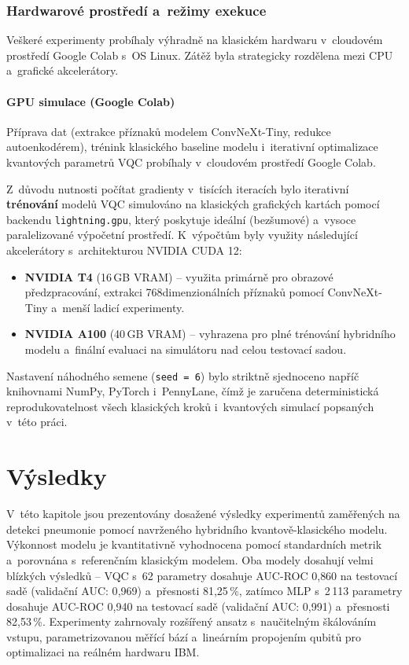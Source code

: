 \documentclass[12pt, a4paper]{report}
\begin{document}
\subsection{Hardwarové prostředí a~režimy exekuce}

Veškeré experimenty probíhaly výhradně na klasickém hardwaru v~cloudovém prostředí Google Colab s~OS Linux. Zátěž byla strategicky rozdělena mezi CPU a~grafické akcelerátory.

\subsubsection*{GPU simulace (Google Colab)}
Příprava dat (extrakce příznaků modelem ConvNeXt-Tiny, redukce autoenkodérem), trénink klasického baseline modelu i~iterativní optimalizace kvantových parametrů VQC probíhaly v~cloudovém prostředí Google Colab.

Z~důvodu nutnosti počítat gradienty v~tisících iteracích bylo iterativní \textbf{trénování} modelů VQC simulováno na klasických grafických kartách pomocí backendu \texttt{lightning.gpu}, který poskytuje ideální (bezšumové) a~vysoce paralelizované výpočetní prostředí. K~výpočtům byly využity následující akcelerátory s~architekturou NVIDIA CUDA 12:
\begin{itemize}
    \item \textbf{NVIDIA T4} (16\,GB VRAM) -- využita primárně pro obrazové předzpracování, extrakci 768dimenzionálních příznaků pomocí ConvNeXt-Tiny a~menší ladicí experimenty.
    \item \textbf{NVIDIA A100} (40\,GB VRAM) -- vyhrazena pro plné trénování hybridního modelu a~finální evaluaci na simulátoru nad celou testovací sadou.
\end{itemize}

Nastavení náhodného semene (\texttt{seed = 6}) bylo striktně sjednoceno napříč knihovnami NumPy, PyTorch i~PennyLane, čímž je zaručena deterministická reprodukovatelnost všech klasických kroků i~kvantových simulací popsaných v~této práci.

\chapter{Výsledky} \label{chap:vysledky}

V~této kapitole jsou prezentovány dosažené výsledky experimentů zaměřených na detekci pneumonie pomocí navrženého hybridního kvantově-klasického modelu. Výkonnost modelu je kvantitativně vyhodnocena pomocí standardních metrik a~porovnána s~referenčním klasickým modelem. Oba modely dosahují velmi blízkých výsledků -- VQC s~62 parametry dosahuje AUC-ROC 0{,}860 na testovací sadě (validační AUC: 0{,}969) a~přesnosti 81{,}25\,\%, zatímco MLP s~2\,113 parametry dosahuje AUC-ROC 0{,}940 na testovací sadě (validační AUC: 0{,}991) a~přesnosti 82{,}53\,\%. Experimenty zahrnovaly rozšířený ansatz s~naučitelným škálováním vstupu, parametrizovanou měřící bází a~lineárním propojením qubitů pro optimalizaci na reálném hardwaru IBM.
\end{document}
